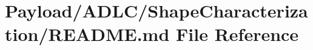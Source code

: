 \hypertarget{Payload_2ADLC_2ShapeCharacterization_2README_8md}{\section{Payload/\-A\-D\-L\-C/\-Shape\-Characterization/\-R\-E\-A\-D\-M\-E.md File Reference}
\label{Payload_2ADLC_2ShapeCharacterization_2README_8md}
}

